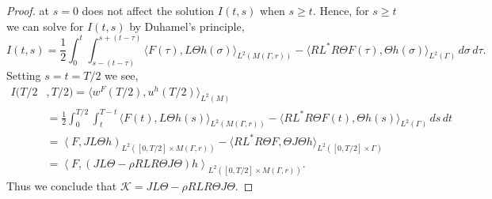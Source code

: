 \documentclass[final,leqno]{siamart1116}
\begin{document}
\begin{proof}
  at $s = 0$ does not affect the solution $I(t,s)$ when $s \geq t$.
  Hence, for $s \geq t$ we can solve for $I(t,s)$ by Duhamel's
  principle,
  \begin{equation}
    I(t,s) = \frac{1}{2} \int_0^t \int_{s-(t-\tau)}^{s+(t-\tau)} \langle F(\tau), L \Theta h(\sigma)\rangle_{L^2(M(\Gamma,r))} - \langle RL^* R\Theta F(\tau), \Theta h(\sigma) \rangle_{L^2(\Gamma)} \,d\sigma\,d\tau .
  \end{equation}
  Setting $s = t = T/2$ we see,
  \begin{align*}
    I(T/2&,T/2) = \langle w^F(T/2), u^h(T/2) \rangle_{L^2(M)} \\
               &= \frac 1 2 \int_0^{T/2} \int_{t}^{T - t} \langle F(t), L \Theta h(s)\rangle_{L^2(M(\Gamma,r))} - \langle RL^* R \Theta F(t), \Theta h(s)\rangle_{L^2(\Gamma)} \,ds \,dt\\
               &= \left\langle F, J L \Theta h\right)_{L^2([0,T/2] \times M(\Gamma,r))} - \langle RL^* R  \Theta F, \Theta J \Theta h \rangle_{L^2([0,T/2] \times \Gamma)}\\
               &= \left\langle F, (J L \Theta - \rho RLR\Theta J \Theta) h\right\rangle_{L^2([0,T/2] \times M(\Gamma,r))} .
  \end{align*}
  Thus we conclude that
  ${\mathcal{K}} = JL\Theta - \rho R L R \Theta J \Theta$.  \qquad
\end{proof}
\end{document}
